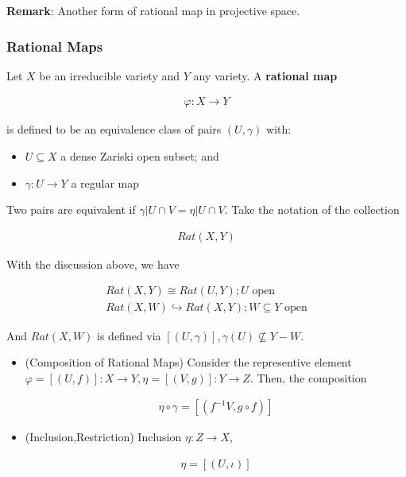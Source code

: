\documentclass[Total.tex]{subfiles}
\begin{document}
		\textbf{Remark}: Another form of rational map in projective space.
		
		
		
		\subsubsection{Rational Maps}
		
		\begin{Def}
			Let $X$ be an irreducible variety and $Y$ any variety. A \textbf{rational map}
			
			\begin{gather*}
				\varphi:X\rightarrow Y
			\end{gather*}
			
			is defined to be an equivalence class of pairs $(U,\gamma)$ with:
			
			\begin{itemize}
				\item $U\subseteq X$ a dense Zariski open subset; and 
				\item $\gamma:U\rightarrow Y$ a regular map
			\end{itemize}
			
			Two pairs are equivalent if $\gamma|U\cap V=\eta|U\cap V$. Take the notation of the collection
			
			\begin{gather*}
				Rat(X,Y)
			\end{gather*}
		\end{Def}
		
		With the discussion above, we have
		
		\begin{gather*}
			Rat(X,Y)\cong Rat(U,Y);U\mbox{ open}\\
			Rat(X,W)\hookrightarrow Rat(X,Y);W\subseteq Y\mbox{ open}
		\end{gather*}
		
		And $Rat(X,W)$ is defined via $[(U,\gamma)],\gamma(U)\not\subseteq Y-W$.
		
		\begin{Def} 
			
			\begin{itemize}
				\item 
				(Composition of Rational Maps) Consider the representive element $\varphi=[(U,f)]:X\rightarrow Y,\eta=[(V,g)]:Y\rightarrow Z$. Then, the composition
				
				\begin{gather*}
					\eta\circ\gamma=[(f^{-1}V,g\circ f)]
				\end{gather*}
				
				\item (Inclusion,Restriction) Inclusion $\eta:Z\rightarrow X$,
				
				\begin{gather*}
					\eta=[(U,\iota)]
				\end{gather*}
			\end{itemize}
		\end{Def}
		
\end{document}
